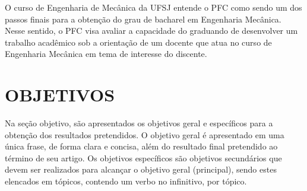 O curso de Engenharia de Mecânica da UFSJ entende o PFC como sendo um dos passos finais para a obtenção do grau de bacharel em Engenharia Mecânica. Nesse sentido, o PFC visa avaliar a capacidade do graduando de desenvolver um trabalho acadêmico sob a orientação de um docente que atua no curso de Engenharia Mecânica em tema de interesse do discente.

\section{OBJETIVOS} %

Na seção objetivo, são apresentados os objetivos geral e específicos para a obtenção dos resultados pretendidos. O objetivo geral é apresentado em uma única frase, de forma clara e concisa, além do resultado final pretendido ao término de seu artigo. Os objetivos específicos são objetivos secundários que devem ser realizados para alcançar o objetivo geral (principal), sendo estes elencados em tópicos, contendo um verbo no infinitivo, por tópico.

